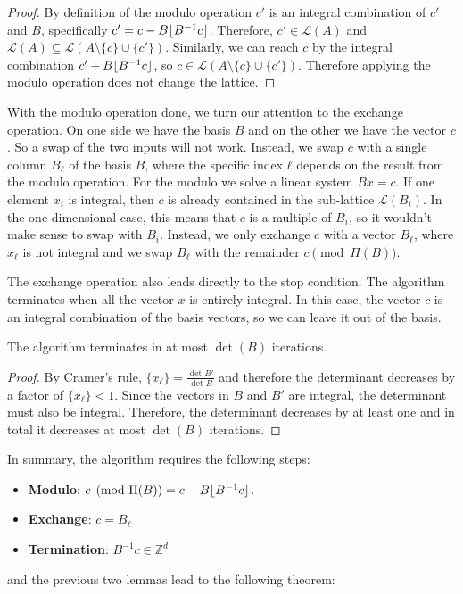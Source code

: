 \begin{proof}
  By definition of the modulo operation $c'$ is an integral combination of $c'$ and $B$,
  specifically $c' = c - B \lfloor B^{-1} c\rfloor$.
  Therefore, $c' ∈ \mathcal L(A)$ and $\mathcal L(A) ⊆ \mathcal L(A \setminus \{c\} ∪ \{c'\})$.
  Similarly, we can reach $c$ by the integral combination $c' + B \lfloor B^{-1} c\rfloor$,
  so $c ∈ \mathcal L(A \setminus \{c\} ∪ \{c'\})$.
  Therefore applying the modulo operation does not change the lattice.
\end{proof}

With the modulo operation done, we turn our attention to the exchange operation.
On one side we have the basis $B$ and on the other we have the vector $c$.
So a swap of the two inputs will not work.
Instead, we swap $c$ with a single column $B_ℓ$ of the basis $B$,
where the specific index $ℓ$ depends on the result from the modulo operation.
For the modulo we solve a linear system $Bx = c$.
If one element $x_i$ is integral, then $c$ is already contained in the
sub-lattice $\mathcal L(B_i)$.
In the one-dimensional case, this means that $c$ is a multiple of $B_i$,
so it wouldn't make sense to swap with $B_i$.
Instead, we only exchange $c$ with a vector $B_ℓ$, where $x_ℓ$ is not integral
and we swap $B_ℓ$ with the remainder $c \pmod{Π(B)}$.

The exchange operation also leads directly to the stop condition.
The algorithm terminates when all the vector $x$ is entirely integral.
In this case, the vector $c$ is an integral combination of the basis vectors,
so we can leave it out of the basis.

\begin{lemma}
  The algorithm terminates in at most $\det(B)$ iterations.
\end{lemma}

\begin{proof}
  By Cramer's rule, $\{x_ℓ\} = \frac{\det B'}{\det B}$
  and therefore the determinant decreases by a factor of $\{x_ℓ\} < 1$.
  Since the vectors in $B$ and $B'$ are integral, the determinant must also be integral.
  Therefore, the determinant decreases by at least one and in total it
  decreases at most $\det(B)$ iterations.
\end{proof}

In summary, the algorithm requires the following steps:
\begin{itemize}
  \item \textbf{Modulo}: $c \pmod{\Pi(B)} = c - B \lfloor B^{-1} c\rfloor$.
  \item \textbf{Exchange}: $c = B_ℓ$
  \item \textbf{Termination}: $B^{-1} c ∈ ℤ^d$
\end{itemize}
and the previous two lemmas lead to the following theorem:

